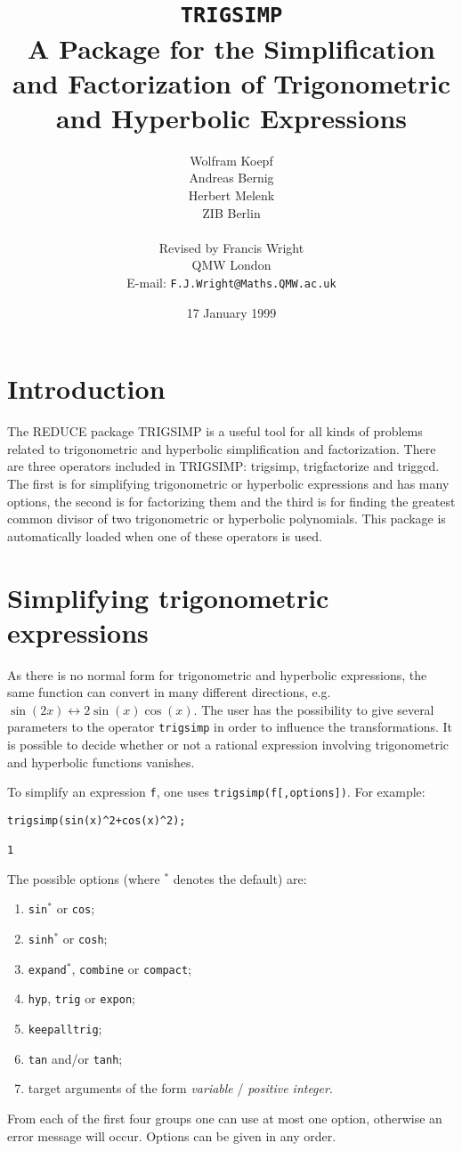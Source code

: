 \documentclass[11pt]{article}
\title{\texttt{TRIGSIMP} \\
A \REDUCE{} Package for the Simplification and Factorization of
Trigonometric and Hyperbolic Expressions}
\author{Wolfram Koepf \\
	Andreas Bernig \\
	Herbert Melenk \\
	ZIB Berlin \\
	~ \\
	Revised by Francis Wright \\
	QMW London \\
	E-mail: \texttt{F.J.Wright@Maths.QMW.ac.uk}}
\date{17 January 1999}
\newcommand{\REDUCE}{REDUCE}
\begin{document}
\maketitle

\section{Introduction}

The \REDUCE{} package TRIGSIMP is a useful tool for all kinds of
problems related to trigonometric and hyperbolic simplification and
factorization.  There are three operators included in TRIGSIMP:
trigsimp, trigfactorize and triggcd.  The first is for simplifying
trigonometric or hyperbolic expressions and has many options, the
second is for factorizing them and the third is for finding the
greatest common divisor of two trigonometric or hyperbolic
polynomials.  This package is automatically loaded when one of these
operators is used.


\section{Simplifying trigonometric expressions}

As there is no normal form for trigonometric and hyperbolic
expressions, the same function can convert in many different
directions, e.g.\ $\sin(2x) \leftrightarrow 2\sin(x)\cos(x)$.  The
user has the possibility to give several parameters to the operator
\texttt{trigsimp} in order to influence the transformations.  It is
possible to decide whether or not a rational expression involving
trigonometric and hyperbolic functions vanishes.

To simplify an expression \texttt{f}, one uses
\texttt{trigsimp(f[,options])}.  For example:
\begin{verbatim}
trigsimp(sin(x)^2+cos(x)^2);

1
\end{verbatim}
The possible options (where $^*$ denotes the default) are:
\begin{enumerate}
\item \texttt{sin}$^*$ or \texttt{cos};
\item \texttt{sinh}$^*$ or \texttt{cosh};
\item \texttt{expand}$^*$, \texttt{combine} or \texttt{compact};
\item \texttt{hyp}, \texttt{trig} or \texttt{expon};
\item \texttt{keepalltrig};
\item \texttt{tan} and/or \texttt{tanh};
\item target arguments of the form \textit{variable} /
\textit{positive integer}.
\end{enumerate}
From each of the first four groups one can use at most one option,
otherwise an error message will occur.  Options can be given in any
order.
\end{document}
